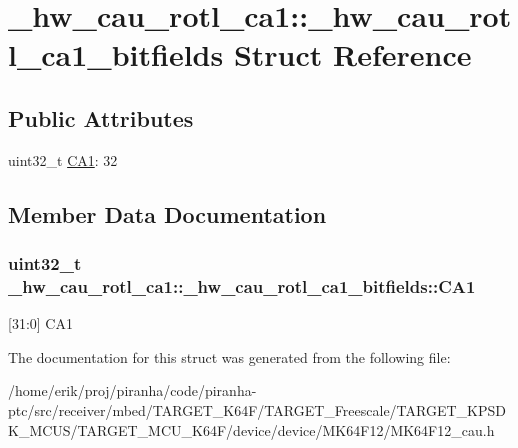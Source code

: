 \hypertarget{struct__hw__cau__rotl__ca1_1_1__hw__cau__rotl__ca1__bitfields}{}\section{\+\_\+hw\+\_\+cau\+\_\+rotl\+\_\+ca1\+:\+:\+\_\+hw\+\_\+cau\+\_\+rotl\+\_\+ca1\+\_\+bitfields Struct Reference}
\label{struct__hw__cau__rotl__ca1_1_1__hw__cau__rotl__ca1__bitfields}
\subsection*{Public Attributes}
\begin{DoxyCompactItemize}
\item 
uint32\+\_\+t \hyperlink{struct__hw__cau__rotl__ca1_1_1__hw__cau__rotl__ca1__bitfields_aa27415de6b9166fca3a040c1e58ae24f}{C\+A1}\+: 32
\end{DoxyCompactItemize}


\subsection{Member Data Documentation}
\subsubsection[{\texorpdfstring{C\+A1}{CA1}}]{\setlength{\rightskip}{0pt plus 5cm}uint32\+\_\+t \+\_\+hw\+\_\+cau\+\_\+rotl\+\_\+ca1\+::\+\_\+hw\+\_\+cau\+\_\+rotl\+\_\+ca1\+\_\+bitfields\+::\+C\+A1}\hypertarget{struct__hw__cau__rotl__ca1_1_1__hw__cau__rotl__ca1__bitfields_aa27415de6b9166fca3a040c1e58ae24f}{}\label{struct__hw__cau__rotl__ca1_1_1__hw__cau__rotl__ca1__bitfields_aa27415de6b9166fca3a040c1e58ae24f}
\mbox{[}31\+:0\mbox{]} C\+A1 

The documentation for this struct was generated from the following file\+:\begin{DoxyCompactItemize}
\item 
/home/erik/proj/piranha/code/piranha-\/ptc/src/receiver/mbed/\+T\+A\+R\+G\+E\+T\+\_\+\+K64\+F/\+T\+A\+R\+G\+E\+T\+\_\+\+Freescale/\+T\+A\+R\+G\+E\+T\+\_\+\+K\+P\+S\+D\+K\+\_\+\+M\+C\+U\+S/\+T\+A\+R\+G\+E\+T\+\_\+\+M\+C\+U\+\_\+\+K64\+F/device/device/\+M\+K64\+F12/M\+K64\+F12\+\_\+cau.\+h\end{DoxyCompactItemize}
